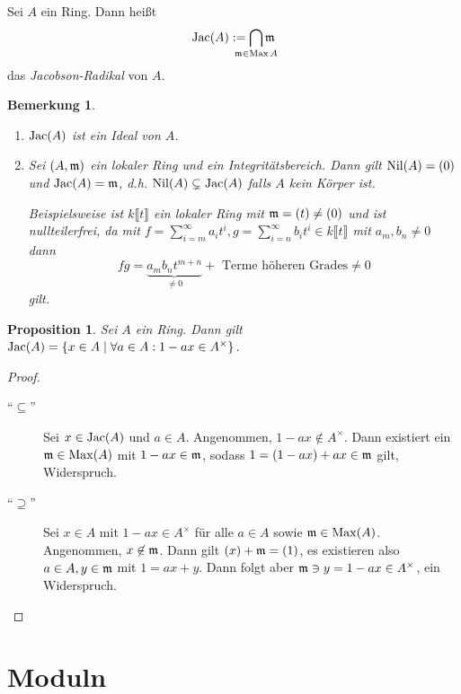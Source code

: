 \documentclass[12pt,a4paper]{scrartcl}
\theoremstyle{cplain}
\newtheorem{prop}[thmcounter]{Proposition}
\theoremstyle{cdef}
\newtheorem{beme}[thmcounter]{Bemerkung}
\begin{document}
\begin{defi}
    Sei $A$ ein Ring. Dann heißt \[\Jac(A) := \bigcap_{\mathclap{\fm\in \Max{A}}} \fm\] das \emph{Jacobson-Radikal} von $A$.
\end{defi}
\begin{beme}
    \leavevmode
    \begin{enumerate}
        \item $\operatorname{Jac}(A)$ ist ein Ideal von $A$.
        \item Sei $(A, \mathfrak{m})$ ein lokaler Ring und ein Integritätsbereich. Dann gilt $\operatorname{Nil}(A)=(0)$ und $\operatorname{Jac}(A) = \mathfrak{m}$, d.h. $\operatorname{Nil}(A) \subsetneq \operatorname{Jac}(A)$ falls $A$ kein Körper ist.
        
        Beispielsweise ist $k\llbracket t\rrbracket$ ein lokaler Ring mit $\mathfrak{m}=(t)\neq (0)$ und ist nullteilerfrei, da mit $f=\sum_{i=m}^\infty a_it^i,g=\sum_{i=n}^\infty b_it^i \in k\llbracket t\rrbracket$ mit $a_m,b_n \neq 0$ dann \[ fg = \underbrace{a_mb_nt^{m+n}}_{\neq 0} + \text{ Terme höheren Grades} \neq 0 \] gilt.
    \end{enumerate}
\end{beme}
\begin{prop} \label{prop:jacobson}
    Sei $A$ ein Ring. Dann gilt $\operatorname{Jac}(A) = \{x\in A \mid \forall a\in A: 1-ax\in A^{\times} \}$.
\end{prop}
\begin{proof}
    \leavevmode
    \begin{description}
        \item[\enquote{$\subseteq$}] Sei $x\in \operatorname{Jac}(A)$ und $a\in A$. Angenommen, $1-ax\not \in A^{\times}$. Dann existiert ein $\mathfrak{m}\in \operatorname{Max}(A)$ mit $1-ax\in \mathfrak{m}$, sodass $1=(1-ax)+ax\in \mathfrak{m}$ gilt, Widerspruch.
        \item[\enquote{$\supseteq$}] Sei $x \in A$ mit $1-ax\in A^{\times}$ für alle $a \in A$ sowie $\mathfrak{m}\in \operatorname{Max}(A)$. Angenommen, $x\not \in \mathfrak{m}$. Dann gilt $(x)+\mathfrak{m}=(1)$, es existieren also $a\in A, y\in \mathfrak{m}$ mit $1=ax+y$. Dann folgt aber $\mathfrak{m} \ni y = 1-ax \in A^{\times}$, ein Widerspruch.
        \qedhere
    \end{description}
\end{proof}

\section{Moduln}
\end{document}
